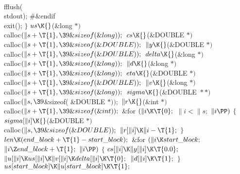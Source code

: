 \\{fflush}(\\{stdout});\6
\8\#\&{endif}\6
\\{exit}();\6
\4${}\}{}$\2\6
${}\\{us}\K{}$(\&{long} ${}{*}){}$ \\{calloc}${}(\|s+\T{1},\39\&{sizeof}(%
\&{long}));{}$\6
${}\\{cs}\K{}$(\&{DOUBLE} ${}{*}){}$ \\{calloc}${}(\|s+\T{1},\39\&{sizeof}(%
\&{DOUBLE}));{}$\6
${}\|y\K{}$(\&{DOUBLE} ${}{*}){}$ \\{calloc}${}(\|s+\T{1},\39\&{sizeof}(%
\&{DOUBLE}));{}$\6
${}\\{delta}\K{}$(\&{long} ${}{*}){}$ \\{calloc}${}(\|s+\T{1},\39\&{sizeof}(%
\&{long}));{}$\6
${}\|d\K{}$(\&{long} ${}{*}){}$ \\{calloc}${}(\|s+\T{1},\39\&{sizeof}(%
\&{long}));{}$\6
${}\\{eta}\K{}$(\&{DOUBLE} ${}{*}){}$ \\{calloc}${}(\|s+\T{1},\39\&{sizeof}(%
\&{DOUBLE}));{}$\6
${}\|v\K{}$(\&{long} ${}{*}){}$ \\{calloc}${}(\|s+\T{1},\39\&{sizeof}(%
\&{long}));{}$\6
${}\\{sigma}\K{}$(\&{DOUBLE} ${}{*}{*}){}$ \\{calloc}${}(\|s,\39{}$\&{sizeof}(%
\&{DOUBLE} ${}{*}));{}$\6
${}\|r\K{}$(\&{int} ${}{*}){}$ \\{calloc}${}(\|s+\T{1},\39\&{sizeof}(%
\&{int}));{}$\6
\&{for} ${}(\|i\K\T{0};{}$ ${}\|i<\|s;{}$ ${}\|i\PP){}$\5
${}\{{}$\1\6
${}\\{sigma}[\|i]\K{}$(\&{DOUBLE} ${}{*}){}$ \\{calloc}${}(\|s,\39\&{sizeof}(%
\&{DOUBLE}));{}$\6
${}\|r[\|i]\K\|i-\T{1};{}$\6
\4${}\}{}$\2\7
${}\\{len}\K(\\{end\_block}+\T{1}-\\{start\_block});{}$\6
\&{for} ${}(\|i\K\\{start\_block};{}$ ${}\|i\Z\\{end\_block}+\T{1};{}$ ${}\|i%
\PP){}$\5
${}\{{}$\1\6
${}\\{cs}[\|i]\K\|y[\|i]\K\T{0.0};{}$\6
${}\|u[\|i]\K\\{us}[\|i]\K\|v[\|i]\K\\{delta}[\|i]\K\T{0};{}$\6
${}\|d[\|i]\K\T{1};{}$\6
\4${}\}{}$\2\6
${}\\{us}[\\{start\_block}]\K\|u[\\{start\_block}]\K\T{1};{}$\6
